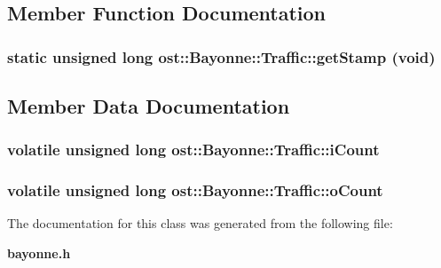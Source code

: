 \subsection{Member Function Documentation}
\subsubsection[{getStamp}]{\setlength{\rightskip}{0pt plus 5cm}static unsigned long ost::Bayonne::Traffic::getStamp (void)\hspace{0.3cm}{\ttfamily  [inline, static]}}\label{classost_1_1_bayonne_1_1_traffic_a2e1af1ccef8ead48f1f4831aad7f7d50}


\subsection{Member Data Documentation}
\subsubsection[{iCount}]{\setlength{\rightskip}{0pt plus 5cm}volatile unsigned long {\bf ost::Bayonne::Traffic::iCount}}\label{classost_1_1_bayonne_1_1_traffic_a3bc3df2cf0a7164af5703de874afba50}
\subsubsection[{oCount}]{\setlength{\rightskip}{0pt plus 5cm}volatile unsigned long {\bf ost::Bayonne::Traffic::oCount}}\label{classost_1_1_bayonne_1_1_traffic_a949e929d61242fc9de622335efa6e529}


The documentation for this class was generated from the following file:\begin{DoxyCompactItemize}
\item 
{\bf bayonne.h}\end{DoxyCompactItemize}
